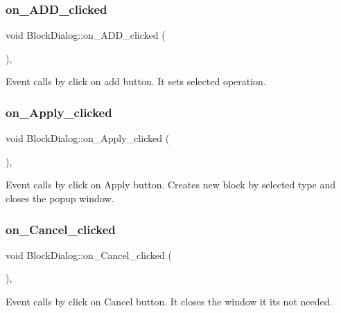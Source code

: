 \subsubsection{\texorpdfstring{on\+\_\+\+A\+D\+D\+\_\+clicked}{on\_ADD\_clicked}}
{\footnotesize\ttfamily void Block\+Dialog\+::on\+\_\+\+A\+D\+D\+\_\+clicked (\begin{DoxyParamCaption}{ }\end{DoxyParamCaption})\hspace{0.3cm}{\ttfamily [private]}, {\ttfamily [slot]}}

Event calls by click on add button. It sets selected operation. \mbox{\label{classBlockDialog_a5e445ed193d3f7e2eba29e192f038221}} 
\subsubsection{\texorpdfstring{on\+\_\+\+Apply\+\_\+clicked}{on\_Apply\_clicked}}
{\footnotesize\ttfamily void Block\+Dialog\+::on\+\_\+\+Apply\+\_\+clicked (\begin{DoxyParamCaption}{ }\end{DoxyParamCaption})\hspace{0.3cm}{\ttfamily [private]}, {\ttfamily [slot]}}

Event calls by click on Apply button. Creates new block by selected type and closes the popup window. \mbox{\label{classBlockDialog_a875bd7ee646be1c30b90f09d3666b4b1}} 
\subsubsection{\texorpdfstring{on\+\_\+\+Cancel\+\_\+clicked}{on\_Cancel\_clicked}}
{\footnotesize\ttfamily void Block\+Dialog\+::on\+\_\+\+Cancel\+\_\+clicked (\begin{DoxyParamCaption}{ }\end{DoxyParamCaption})\hspace{0.3cm}{\ttfamily [private]}, {\ttfamily [slot]}}

Event calls by click on Cancel button. It closes the window it its not needed. \mbox{\label{classBlockDialog_a01cf45f68a5b5b688916be2a8d78e7eb}} 
